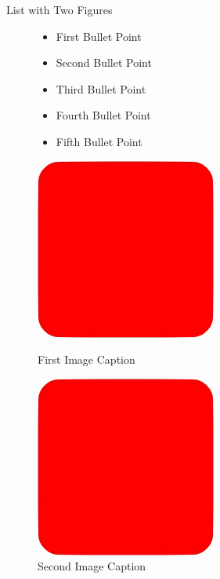 \begin{frame}{List with Two Figures}
\begin{figure}
    \centering
    \begin{minipage}{0.48\textwidth}
        \begin{itemize}
            \item First Bullet Point
            \item Second Bullet Point
            \item Third Bullet Point
            \item Fourth Bullet Point
            \item Fifth Bullet Point
        \end{itemize}
    \end{minipage}
    \begin{minipage}{0.48\textwidth}
        \centering
        \includegraphics[width=0.4\linewidth]{assets/placeholder.png}
        \caption{First Image Caption}
        \vspace{10pt}
        \includegraphics[width=0.4\linewidth]{assets/placeholder.png}
        \caption{Second Image Caption}
    \end{minipage}
\end{figure}
\end{frame}
